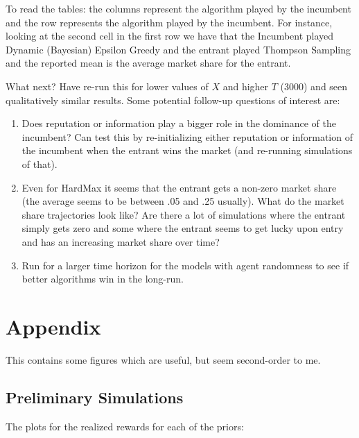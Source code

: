 \documentclass[11pt,letterpaper]{article}
\begin{document}
To read the tables: the columns represent the algorithm played by the incumbent and the row represents the algorithm played by the incumbent. For instance, looking at the second cell in the first row we have that the Incumbent played Dynamic (Bayesian) Epsilon Greedy and the entrant played Thompson Sampling and the reported mean is the average market share for the entrant.



What next? Have re-run this for lower values of $X$ and higher $T$ (3000) and seen qualitatively similar results. Some potential follow-up questions of interest are:
\begin{enumerate}
\item Does reputation or information play a bigger role in the dominance of the incumbent? Can test this by re-initializing either reputation or information of the incumbent when the entrant wins the market (and re-running simulations of that).
\item Even for HardMax it seems that the entrant gets a non-zero market share (the average seems to be between .05 and .25 usually). What do the market share trajectories look like? Are there a lot of simulations where the entrant simply gets zero and some where the entrant seems to get lucky upon entry and has an increasing market share over time?
\item Run for a larger time horizon for the models with agent randomness to see if better algorithms win in the long-run.
\end{enumerate}

\section*{Appendix}

This contains some figures which are useful, but seem second-order to me.

\subsection*{Preliminary Simulations}

The plots for the realized rewards for each of the priors:
\end{document}
